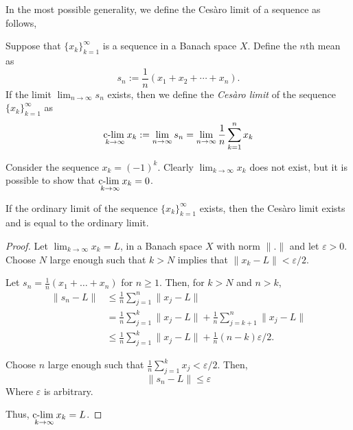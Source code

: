\documentclass{owmaths}
\begin{document}
In the most possible generality, we define the Ces\`aro limit of a sequence
as follows,
\begin{definition}
    Suppose that $\{x_k\}_{k=1}^\infty$ is a sequence in a Banach space $X$. 
    Define the $n$th mean as
    \begin{equation*}
        s_n := \frac{1}{n}(x_1+x_2+\cdots+x_n).
    \end{equation*}    
    If the limit $\lim_{n\rightarrow\infty}s_n$ exists, then 
    we define the \emph{Ces\`aro limit} of the sequence $\{x_k\}_{k=1}^\infty$ as
    \begin{equation*}
        \underset{{k\rightarrow\infty}}{\operatorname{c-lim}\;} x_k := \lim_{n\rightarrow\infty} s_n = \lim_{n\rightarrow\infty} \frac{1}{n}\sum_{k=1}^n x_k
    \end{equation*}
\end{definition}
\begin{example}
    Consider the sequence $x_k = (-1)^k$. Clearly $\lim_{k\rightarrow\infty} x_k$
    does not exist, but it is possible to show that $\underset{k\rightarrow\infty}{\operatorname{c-lim}\;} x_k = 0$.
\end{example}
\begin{proposition}
    If the ordinary limit of the sequence $\{x_k\}_{k=1}^\infty$ exists, then 
    the Ces\`aro limit exists and is equal to the ordinary limit.
\end{proposition}
\begin{proof}
    Let $\lim_{k\rightarrow\infty} x_k = L$,
    in a Banach space $X$ with norm $\|.\|$ and let $\varepsilon > 0$.
    Choose $N$ large enough such that $k > N$ implies that $\|x_k - L\| < \varepsilon/2$. 
    
    Let $s_n = \frac{1}{n}(x_1+\ldots+x_n)$ for $n \geq 1$. Then,
    for $k > N$ and $n > k$,
    \begin{align*}
        \|s_n - L\| &\leq \frac{1}{n}\sum_{j=1}^n \|x_j-L\|\\
        &= \frac{1}{n}\sum_{j=1}^k \|x_j-L\| + \frac{1}{n}\sum_{j=k+1}^n \|x_j-L\|\\
        &\leq \frac{1}{n} \sum_{j=1}^k \|x_j-L\| + \frac{1}{n}(n-k)\varepsilon/2.
    \end{align*}
    
    Choose $n$ large enough such that $\frac{1}{n}\sum_{j=1}^k x_j< \varepsilon/2$.
    Then,
    \begin{equation*}
        \|s_n - L\| \leq \varepsilon
    \end{equation*}
    Where $\varepsilon$ is arbitrary.
    
    
    Thus, $\underset{k\rightarrow\infty}{\operatorname{c-lim}\;} x_k = L$.
\end{proof}
\end{document}
